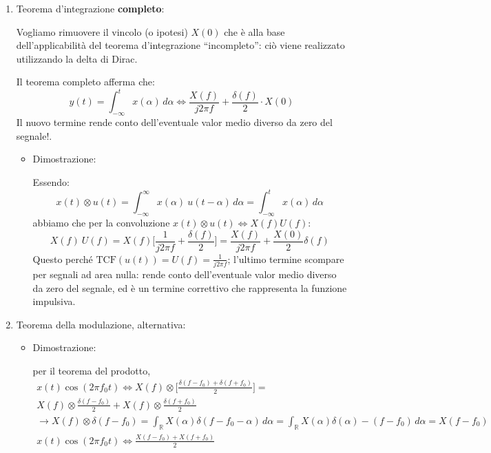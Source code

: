 \documentclass[
  paper=a4,
  ,captions=tableheading
]{scrartcl}
\begin{document}
\begin{enumerate}
\def\labelenumi{\arabic{enumi}.}
\setcounter{enumi}{21}
\item
  Teorema d'integrazione \textbf{completo}:

  Vogliamo rimuovere il vincolo (o ipotesi) \(X(0)\) che è alla base
  dell'applicabilità del teorema d'integrazione ``incompleto'': ciò
  viene realizzato utilizzando la delta di Dirac.

  Il teorema completo afferma che: \[
  y(t) = \int_{-\infty}^{t} x(\alpha)\,d\alpha \Longleftrightarrow \frac{X(f)}{j2\pi f} + \frac{\delta(f)}{2}\cdot X(0)  
  \] Il nuovo termine rende conto dell'eventuale valor medio diverso da
  zero del segnale!.

  \begin{itemize}
  \item
    Dimostrazione:

    Essendo: \[
      x(t)\otimes u(t) = \int_{-\infty}^{\infty} x(\alpha) \ u(t-\alpha)\,d\alpha = \int_{-\infty}^{t} x(\alpha)\,d\alpha
      \] abbiamo che per la convoluzione
    \(x(t)\otimes u(t)\Longleftrightarrow X(f)U(f)\): \[
      X(f)\ U(f)=X(f)\Big[\frac{1}{j2\pi f}+\frac{\delta(f)}{2}\Big] = \frac{X(f)}{j2\pi f}+ \frac{X(0)}{2}\delta(f)
      \] Questo perché \(\text{TCF}(u(t))=U(f)=\frac{1}{j2\pi f}\);
    l'ultimo termine scompare per segnali ad area nulla: rende conto
    dell'eventuale valor medio diverso da zero del segnale, ed è un
    termine correttivo che rappresenta la funzione impulsiva.
  \end{itemize}
\item
  Teorema della modulazione, alternativa:

  \begin{itemize}
  \item
    Dimostrazione:

    per il teorema del prodotto, \begin{gather*}
      x(t)\cos(2\pi f_{0}t) \Longleftrightarrow X(f) \otimes \Big[ \frac{\delta(f-f_0)+\delta(f+f_0)}{2} \Big] = \\ X(f) \otimes \frac{\delta(f-f_0)}{2} + X(f) \otimes  \frac{\delta(f+f_0)}{2} \\
      \to X(f)\otimes \delta(f-f_0) = \int_{\mathbb{R}}X(\alpha) \delta(f-f_0 -\alpha)\,d\alpha = \int_{\mathbb{R}}X(\alpha) \delta(\alpha) -(f-f_0)\,d\alpha = X(f-f_0) \\
      x(t)\cos(2\pi f_0 t) \Longleftrightarrow \frac{X(f-f_0)+X(f+f_0)}{2}
      \end{gather*}
  \end{itemize}
\end{enumerate}
\end{document}
